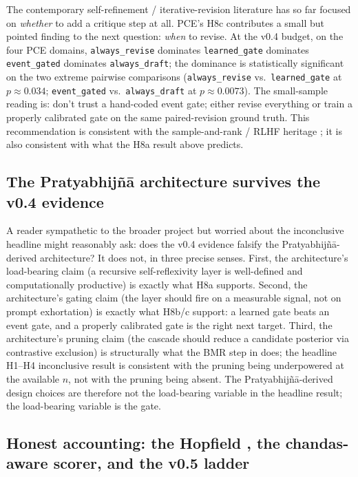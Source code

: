 The contemporary self-refinement / iterative-revision literature \citep{MadaanEtAl2023SelfRefineNeurIPS,ShinnEtAl2023Reflexion,BaiEtAl2022ConstitutionalAI} has so far focused on \emph{whether} to add a critique step at all. PCE's H8c contributes a small but pointed finding to the next question: \emph{when} to revise. At the v0.4 budget, on the four PCE domains, \texttt{always\_revise} dominates \texttt{learned\_gate} dominates \texttt{event\_gated} dominates \texttt{always\_draft}; the dominance is statistically significant on the two extreme pairwise comparisons (\texttt{always\_revise} vs.\ \texttt{learned\_gate} at $p\approx 0.034$; \texttt{event\_gated} vs.\ \texttt{always\_draft} at $p\approx 0.0073$). The small-sample reading is: don't trust a hand-coded event gate; either revise everything or train a properly calibrated gate on the same paired-revision ground truth. This recommendation is consistent with the sample-and-rank / RLHF heritage \citep{StiennonEtAl2020LearningToSummarizeFromHumanFeedback}; it is also consistent with what the H8a result above predicts.

\subsection{The Pratyabhij\~n\=a architecture survives the v0.4 evidence}

A reader sympathetic to the broader project but worried about the inconclusive headline might reasonably ask: does the v0.4 evidence falsify the Pratyabhij\~n\=a-derived architecture? It does not, in three precise senses. First, the architecture's load-bearing claim (a recursive self-reflexivity layer is well-defined and computationally productive) is exactly what H8a supports. Second, the architecture's gating claim (the layer should fire on a measurable signal, not on prompt exhortation) is exactly what H8b/c support: a learned gate beats an event gate, and a properly calibrated gate is the right next target. Third, the architecture's pruning claim (the cascade should reduce a candidate posterior via contrastive exclusion) is structurally what the BMR step in  does; the headline H1--H4 inconclusive result is consistent with the pruning being underpowered at the available $n$, not with the pruning being absent. The Pratyabhij\~n\=a-derived design choices are therefore not the load-bearing variable in the headline result; the load-bearing variable is the gate.

\subsection{Honest accounting: the Hopfield , the chandas-aware scorer, and the v0.5 ladder}

